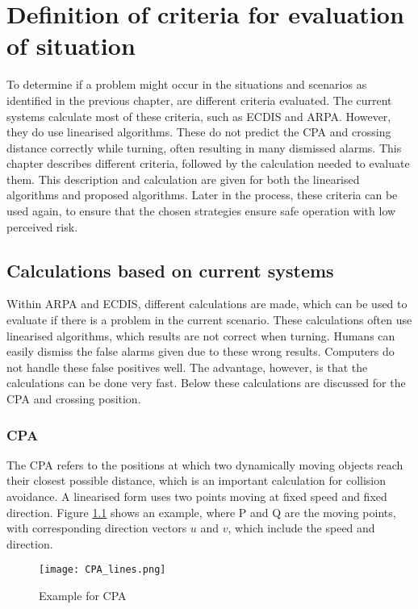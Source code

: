 \chapter{Definition of criteria for evaluation of situation}
\label{ch:criteria-problem}
To determine if a problem might occur in the situations and scenarios as identified in the previous chapter, are different criteria evaluated. The current systems calculate most of these criteria, such as \ac{ECDIS} and \ac{ARPA}. However, they do use linearised algorithms. These do not predict the \ac{CPA} and crossing distance correctly while turning, often resulting in many dismissed alarms. This chapter describes different criteria, followed by the calculation needed to evaluate them. This description and calculation are given for both the linearised algorithms and proposed algorithms. Later in the process, these criteria can be used again, to ensure that the chosen strategies ensure safe operation with low perceived risk.

\section{Calculations based on current systems}
\label{sec:linearised-methods}
Within \ac{ARPA} and \ac{ECDIS}, different calculations are made, which can be used to evaluate if there is a problem in the current scenario. These calculations often use linearised algorithms, which results are not correct when turning. Humans can easily dismiss the false alarms given due to these wrong results. Computers do not handle these false positives well. The advantage, however, is that the calculations can be done very fast. Below these calculations are discussed for the \acf{CPA} and crossing position.

\subsection{\acf{CPA}}
The \ac{CPA} refers to the positions at which two dynamically moving objects reach their closest possible distance, which is an important calculation for collision avoidance. A linearised form uses two points moving at fixed speed and fixed direction. Figure \ref{fig:CPA} shows an example, where P and Q are the moving points, with corresponding direction vectors $u$ and $v$, which include the speed and direction.

\begin{figure}[h]
	\centering
	\texttt{[image: CPA\_lines.png]}
	\caption{Example for \acf{CPA}}
	\label{fig:CPA}
\end{figure}

